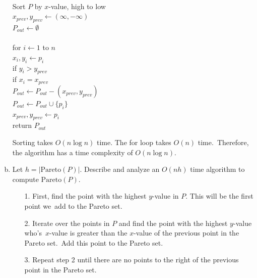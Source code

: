 \documentclass[11pt]{article}
\begin{document}
\begin{enumerate}[(a)]
\begin{solution}
  \begin{algo}
    \+
    \\  Sort \(P\) by \(x\)-value, high to low
    \\  \(x_{prev}, y_{prev} \gets (\infty, -\infty)\)
    \\  \(P_{out} \gets \emptyset\)
    \\
    \\  for \(i \gets 1\) to \(n\)\+
    \\    \(x_i, y_i \gets p_i\)
    \\    if \(y_i > y_{prev}\)\+
    \\      if \(x_i = x_{prev}\)\+
    \\        \(P_{out} \gets P_{out} - (x_{prev}, y_{prev})\)\-
    \\      \(P_{out} \gets P_{out} \cup \{p_i\}\)
    \\      \(x_{prev}, y_{prev} \gets p_i\)\-\-
    \\  return \(P_{out}\)
  \end{algo}

  Sorting takes \(O(n \log n)\) time. The for loop takes \(O(n)\) time.\
  Therefore, the algorithm has a time complexity of \(O(n \log n)\).

\end{solution}

  \item
    Let \(h = |\text{Pareto}(P)|\).
    Describe and analyze an \(O(n h)\) time algorithm to compute \(\text{Pareto}(P)\).

\begin{solution}
  \begin{enumerate}
    \item[1.]
      First, find the point with the highest \(y\)-value in \(P\). This will be the first point we\
      add to the Pareto set.
    \item[2.]
      Iterate over the points in \(P\) and find the point with the highest \(y\)-value who's\
      \(x\)-value is greater than the \(x\)-value of the previous point in the Pareto set.\
      Add this point to the Pareto set.
    \item[3.]
      Repeat step 2 until there are no points to the right of the previous point in the Pareto set.
  \end{enumerate}


\end{solution}
\end{enumerate}
\end{document}
